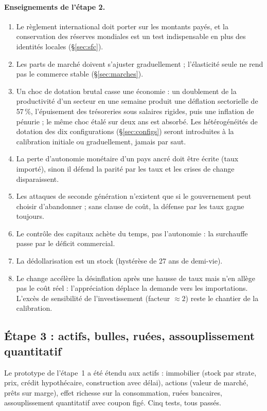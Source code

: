 \documentclass[11pt,a4paper]{article}
\begin{document}
\paragraph{Enseignements de l'étape 2.}
\begin{enumerate}
\item Le règlement international doit porter sur les montants payés, et la conservation des réserves mondiales est un test indispensable en plus des identités locales (\S\ref{sec:sfc}).
\item Les parts de marché doivent s'ajuster graduellement ; l'élasticité seule ne rend pas le commerce stable (\S\ref{sec:marches}).
\item Un choc de dotation brutal casse une économie : un doublement de la productivité d'un secteur en une semaine produit une déflation sectorielle de 57\,\%, l'épuisement des trésoreries sous salaires rigides, puis une inflation de pénurie ; le même choc étalé sur deux ans est absorbé. Les hétérogénéités de dotation des dix configurations (\S\ref{sec:configs}) seront introduites à la calibration initiale ou graduellement, jamais par saut.
\item La perte d'autonomie monétaire d'un pays ancré doit être écrite (taux importé), sinon il défend la parité par les taux et les crises de change disparaissent.
\item Les attaques de seconde génération n'existent que si le gouvernement peut choisir d'abandonner ; sans clause de coût, la défense par les taux gagne toujours.
\item Le contrôle des capitaux achète du temps, pas l'autonomie : la surchauffe passe par le déficit commercial.
\item La dédollarisation est un stock (hystérèse de 27 ans de demi-vie).
\item Le change accélère la désinflation après une hausse de taux mais n'en allège pas le coût réel : l'appréciation déplace la demande vers les importations. L'excès de sensibilité de l'investissement (facteur $\approx2$) reste le chantier de la calibration.
\end{enumerate}

\subsection{Étape 3 : actifs, bulles, ruées, assouplissement quantitatif}
\label{sec:proto3}
Le prototype de l'étape~1 a été étendu aux actifs : immobilier (stock par strate, prix, crédit hypothécaire, construction avec délai), actions (valeur de marché, prêts sur marge), effet richesse sur la consommation, ruées bancaires, assouplissement quantitatif avec coupon figé. Cinq tests, tous passés.
\end{document}
